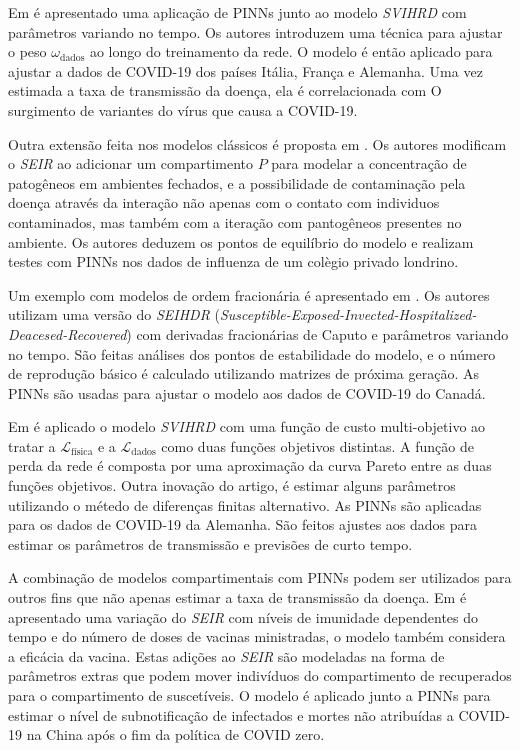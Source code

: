 Em \cite{shamsara-etal:25-omicron} é apresentado uma aplicação de PINNs
junto ao modelo \textit{SVIHRD} com parâmetros variando no tempo. 
Os autores introduzem uma técnica para ajustar o peso $\omega_{\text{dados}}$ 
ao longo do treinamento da rede. O modelo é então aplicado
para ajustar a dados de COVID-19 dos países Itália, França e Alemanha. 
Uma vez estimada a taxa de transmissão da doença, ela é correlacionada com O
surgimento de variantes do vírus que causa a COVID-19.

Outra extensão feita nos modelos clássicos é proposta em \cite{nguyen-etal:22-raissi-seirp}.
Os autores modificam o \textit{SEIR} ao adicionar um compartimento $P$ para 
modelar a concentração de patogêneos em ambientes fechados, e a possibilidade
de contaminação pela doença através da interação não apenas com o contato com
individuos contaminados, mas também com a iteração com pantogêneos presentes no
ambiente. Os autores deduzem os pontos de equilíbrio do modelo e 
realizam testes com PINNs nos dados de influenza de um colègio
privado londrino.     

Um exemplo com modelos de ordem fracionária é apresentado em 
\cite{li-etal:25-ordem-fracionaria}. Os autores utilizam uma versão do 
\textit{SEIHDR} (\textit{Susceptible-Exposed-Invected-Hospitalized-Deacesed-Recovered}) 
com derivadas fracionárias de Caputo e parâmetros variando no tempo.
São feitas análises dos pontos de estabilidade do modelo, e o número de reprodução
básico é calculado utilizando matrizes de próxima geração. 
As PINNs são usadas para ajustar o modelo aos dados de COVID-19 do Canadá.

Em \cite{heldmann-etal:23-biobjective-opt} é aplicado o modelo \textit{SVIHRD}
com uma função de custo multi-objetivo ao tratar a $\mathcal{L}_{\text{física}}$
e a $\mathcal{L}_{\text{dados}}$ como duas funções objetivos distintas.
A função de perda da rede é composta por uma aproximação da curva Pareto entre 
as duas funções objetivos.
Outra inovação do artigo, é estimar alguns parâmetros utilizando o métedo de 
diferenças finitas alternativo. 
As PINNs são aplicadas para os dados de COVID-19 da Alemanha. São feitos ajustes
aos dados para estimar os parâmetros de transmissão e previsões de curto tempo.  

A combinação de modelos compartimentais com PINNs podem ser utilizados para 
outros fins que não apenas estimar a taxa de transmissão da doença.
Em \cite{ghosh-etal:23-subnotificacao} é apresentado uma variação do \textit{SEIR}
com níveis de imunidade dependentes do tempo e do número de doses de vacinas 
ministradas, o modelo também considera a eficácia da vacina. 
Estas adições ao \textit{SEIR} são modeladas na forma de parâmetros extras que 
podem mover indivíduos do compartimento de recuperados para o compartimento de
suscetíveis.
O modelo é aplicado junto a PINNs para estimar o nível de subnotificação de 
infectados e mortes não atribuídas a COVID-19 na China após o fim da política 
de COVID zero.

